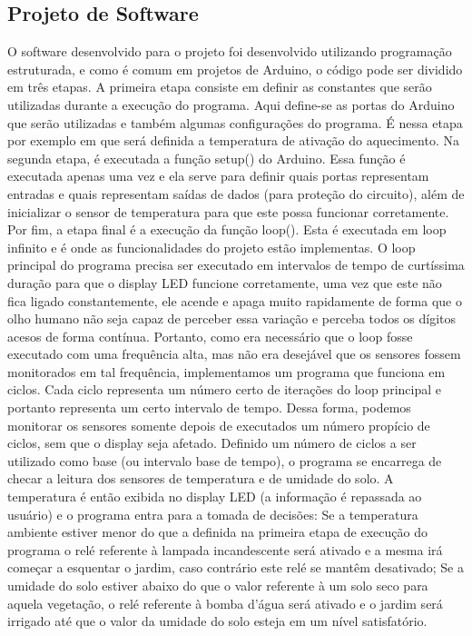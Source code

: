 \documentclass[a4paper,12pt]{article}
\begin{document}
\subsection{Projeto de Software}
O software desenvolvido para o projeto foi desenvolvido utilizando programação estruturada, e como é comum em projetos de Arduino, o código pode ser dividido em três etapas. A primeira etapa consiste em definir as constantes que serão utilizadas durante a execução do programa. Aqui define-se as portas do Arduino que serão utilizadas e também algumas configurações do programa. É nessa etapa por exemplo em que será definida a temperatura de ativação do aquecimento. Na segunda etapa, é executada a função setup() do Arduino. Essa função é executada apenas uma vez e ela serve para definir quais portas representam entradas e quais representam saídas de dados (para proteção do circuito), além de inicializar o sensor de temperatura para que este possa funcionar corretamente. Por fim, a etapa final é a execução da função loop(). Esta é executada em loop infinito e é onde as funcionalidades do projeto estão implementas.
    O loop principal do programa precisa ser executado em intervalos de tempo de curtíssima duração para que o display LED funcione corretamente, uma vez que este não fica ligado constantemente, ele acende e apaga muito rapidamente de forma que o olho humano não seja capaz de perceber essa variação e perceba todos os dígitos acesos de forma contínua. Portanto, como era necessário que o loop fosse executado com uma frequência alta, mas não era desejável que os sensores fossem monitorados em tal frequência, implementamos um programa que funciona em ciclos. Cada ciclo representa um número certo de iterações do loop principal e portanto representa um certo intervalo de tempo. Dessa forma, podemos monitorar os sensores somente depois de executados um número propício de ciclos, sem que o display seja afetado.
    Definido um número de ciclos a ser utilizado como base (ou intervalo base de tempo), o programa se encarrega de checar a leitura dos sensores de temperatura e de umidade do solo. A temperatura é então exibida no display LED (a informação é repassada ao usuário) e o programa entra para a tomada de decisões: Se a temperatura ambiente estiver menor do que a definida na primeira etapa de execução do programa o relé referente à lampada incandescente será ativado e a mesma irá começar a esquentar o jardim, caso contrário este relé se mantêm desativado; Se a umidade do solo estiver abaixo do que o valor referente à um solo seco para aquela vegetação, o relé referente à bomba d’água será ativado e o jardim será irrigado até que o valor da umidade do solo esteja em um nível satisfatório.
\end{document}
